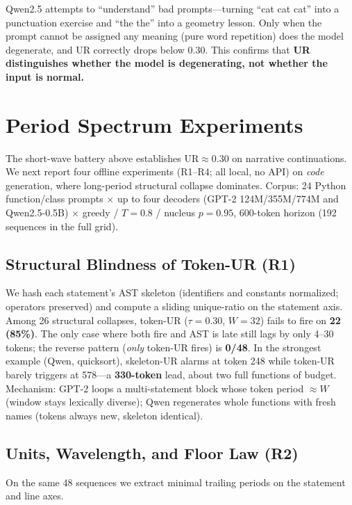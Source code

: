 \documentclass[11pt]{article}
\begin{document}
Qwen2.5 attempts to ``understand'' bad prompts---turning ``cat cat cat'' into a punctuation exercise and ``the the'' into a geometry lesson. Only when the prompt cannot be assigned any meaning (pure word repetition) does the model degenerate, and UR correctly drops below 0.30. This confirms that \textbf{UR distinguishes whether the model is degenerating, not whether the input is normal.}

\section{Period Spectrum Experiments}
\label{sec:period-spectrum}

The short-wave battery above establishes UR$\approx$0.30 on narrative continuations. We next report four offline experiments (R1--R4; all local, no API) on \emph{code} generation, where long-period structural collapse dominates. Corpus: 24 Python function/class prompts $\times$ up to four decoders (GPT-2 124M/355M/774M and Qwen2.5-0.5B) $\times$ greedy / $T{=}0.8$ / nucleus $p{=}0.95$, 600-token horizon (192 sequences in the full grid).

\subsection{Structural Blindness of Token-UR (R1)}
\label{sec:r1}

We hash each statement's AST skeleton (identifiers and constants normalized; operators preserved) and compute a sliding unique-ratio on the statement axis. Among 26 structural collapses, token-UR ($\tau{=}0.30$, $W{=}32$) fails to fire on \textbf{22 (85\%)}. The only case where both fire and AST is late still lags by only 4--30 tokens; the reverse pattern (\emph{only} token-UR fires) is \textbf{0/48}. In the strongest example (Qwen, quicksort), skeleton-UR alarms at token 248 while token-UR barely triggers at 578---a \textbf{330-token} lead, about two full functions of budget. Mechanism: GPT-2 loops a multi-statement block whose token period $\approx W$ (window stays lexically diverse); Qwen regenerates whole functions with fresh names (tokens always new, skeleton identical).

\subsection{Units, Wavelength, and Floor Law (R2)}
\label{sec:r2}

On the same 48 sequences we extract minimal trailing periods on the statement and line axes.
\end{document}
